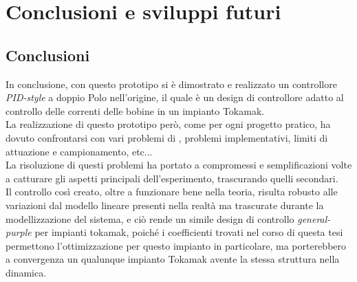 \chapter{Conclusioni e sviluppi futuri}
\section*{Conclusioni}
In conclusione, con questo prototipo si è dimostrato e realizzato un controllore \textit{PID-style} a doppio Polo nell'origine, il quale è un design di controllore adatto al controllo delle correnti delle bobine in un impianto Tokamak.\\
La realizzazione di questo prototipo però, come per ogni progetto pratico, ha dovuto confrontarsi con vari problemi di \nonLinearita, problemi implementativi, limiti di attuazione e campionamento, etc...\\
La risoluzione di questi problemi ha portato a compromessi e semplificazioni volte a catturare gli aspetti principali dell'esperimento, trascurando quelli secondari.\\
Il controllo così creato, oltre a funzionare bene nella teoria, risulta robusto alle variazioni dal modello lineare presenti nella realtà ma trascurate durante la modellizzazione del sistema, e ciò rende un simile design di controllo \textit{general-purple} per impianti tokamak, poiché i coefficienti trovati nel corso di questa tesi permettono l'ottimizzazione per questo impianto in particolare, ma porterebbero a convergenza un qualunque impianto Tokamak avente la stessa struttura nella dinamica.\\

